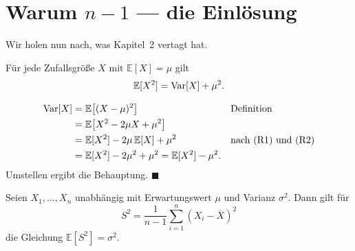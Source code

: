 \section{Warum $n-1$ --- die Einlösung}

Wir holen nun nach, was Kapitel~2 vertagt hat.

\begin{merksatz}
Für jede Zufallsgröße $X$ mit $\mathbb{E}[X] = \mu$ gilt
\[ \mathbb{E}[X^2] = \operatorname{Var}[X] + \mu^2 . \]

\begin{align*}
\operatorname{Var}[X] &= \mathbb{E}\bigl[(X-\mu)^2\bigr] && \text{Definition}\\
&= \mathbb{E}\bigl[X^2 - 2\mu X + \mu^2\bigr]\\
&= \mathbb{E}[X^2] - 2\mu\,\mathbb{E}[X] + \mu^2 && \text{nach (R1) und (R2)}\\
&= \mathbb{E}[X^2] - 2\mu^2 + \mu^2 = \mathbb{E}[X^2] - \mu^2 .
\end{align*}
Umstellen ergibt die Behauptung. $\blacksquare$

\begin{center}
\begin{minipage}{0.88\textwidth}
\end{minipage}
\end{center}
\end{merksatz}

\begin{merksatz}
Seien $X_1,\ldots,X_n$ unabhängig mit Erwartungswert $\mu$ und Varianz $\sigma^2$. Dann gilt für
\[ S^2 = \frac{1}{n-1}\sum_{i=1}^n (X_i - \overline X)^2 \]
die Gleichung $\mathbb{E}[S^2] = \sigma^2$.
\end{merksatz}

